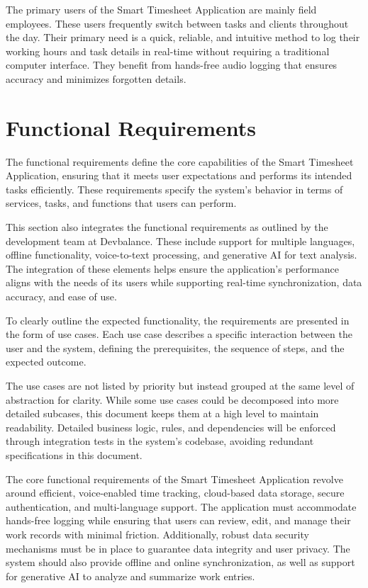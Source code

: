 \documentclass[
  digital,     %
  oneside,     %
  nosansbold,  %
  nocolorbold, %
  lof,         %
  lot,         %
]{fithesis4}
\begin{document}
The primary users of the Smart Timesheet Application are mainly field employees. These users frequently switch between tasks and clients throughout the day. Their primary need is a quick, reliable, and intuitive method to log their working hours and task details in real-time without requiring a traditional computer interface. They benefit from hands-free audio logging that ensures accuracy and minimizes forgotten details.

\section{Functional Requirements}

The functional requirements define the core capabilities of the Smart Timesheet Application, ensuring that it meets user expectations and performs its intended tasks efficiently. These requirements specify the system's behavior in terms of services, tasks, and functions that users can perform.

This section also integrates the functional requirements as outlined by the development team at Devbalance. These include support for multiple languages, offline functionality, voice-to-text processing, and generative AI for text analysis. The integration of these elements helps ensure the application’s performance aligns with the needs of its users while supporting real-time synchronization, data accuracy, and ease of use.

To clearly outline the expected functionality, the requirements are presented in the form of use cases. Each use case describes a specific interaction between the user and the system, defining the prerequisites, the sequence of steps, and the expected outcome.

The use cases are not listed by priority but instead grouped at the same level of abstraction for clarity. While some use cases could be decomposed into more detailed subcases, this document keeps them at a high level to maintain readability. Detailed business logic, rules, and dependencies will be enforced through integration tests in the system’s codebase, avoiding redundant specifications in this document.

The core functional requirements of the Smart Timesheet Application revolve around efficient, voice-enabled time tracking, cloud-based data storage, secure authentication, and multi-language support. The application must accommodate hands-free logging while ensuring that users can review, edit, and manage their work records with minimal friction. Additionally, robust data security mechanisms must be in place to guarantee data integrity and user privacy. The system should also provide offline and online synchronization, as well as support for generative AI to analyze and summarize work entries.
\end{document}
